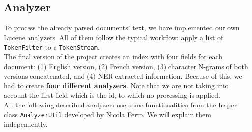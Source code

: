 \subsection{Analyzer}\label{subsec:analyzer}
To process the already parsed documents' text, we have implemented our own Lucene analyzers.
All of them follow the typical workflow: apply a list of \texttt{TokenFilter} to a \texttt{TokenStream}.\\
The final version of the project creates an index with four fields for each document: (1) English version, (2) French
version, (3) character N-grams of both versions concatenated, and (4) NER extracted information.
Because of this, we had to create \textbf{four different analyzers}.
Note that we are not taking into account the first field which is the id, to which no processing is applied.\\
All the following described analyzers use some functionalities from the helper class \texttt{AnalyzerUtil} developed by
Nicola Ferro.
We will explain them independently.

